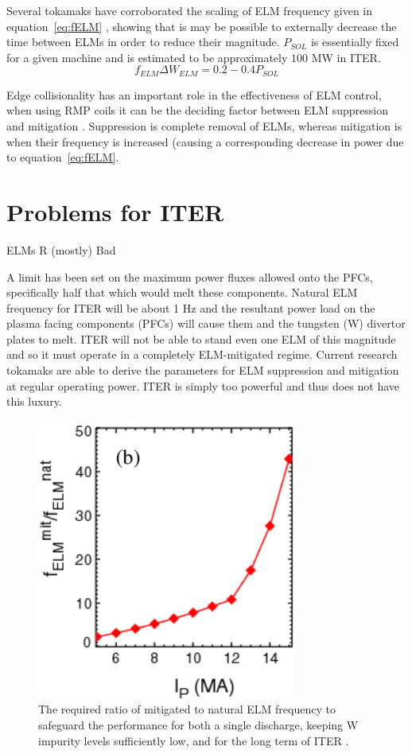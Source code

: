 \documentclass[12pt]{article}  %
\begin{document}
Several tokamaks have corroborated the scaling of ELM frequency given in equation~\ref{eq:fELM} \cite{Leonard1999}\cite{Loarte2002}, showing that is may be possible to externally decrease the time between ELMs in order to reduce their magnitude. $P_{SOL}$ is essentially fixed for a given machine and is estimated to be approximately $100$ MW in ITER.\cite{Eich2013}
\begin{equation}\label{eq:fELM}
f_{ELM}\Delta W_{ELM} = 0.2-0.4 P_{SOL}
\end{equation}

Edge collisionality has an important role in the effectiveness of ELM control, when using RMP coils it can be the deciding factor between ELM suppression and mitigation \cite{Kirk2013}. Suppression is complete removal of ELMs, whereas mitigation is when their frequency is increased (causing a corresponding decrease in power due to equation~\ref{eq:fELM}.


\section{Problems for ITER}\label{sec:Problems}
ELMs R (mostly) Bad \cite{Connor2008}

A limit has been set on the maximum power fluxes allowed onto the PFCs, specifically half that which would melt these components.\cite{Loarte2014a} Natural ELM frequency for ITER will be about 1 Hz and the resultant power load on the plasma facing components (PFCs) will cause them and the tungsten (W) divertor plates to melt\cite{Federici2003}. ITER will not be able to stand even one ELM of this magnitude and so it must operate in a completely ELM-mitigated regime\cite{KirkFF}. Current research tokamaks are able to derive the parameters for ELM suppression and mitigation at regular operating power. ITER is simply too powerful and thus does not have this luxury.

\begin{figure}
\includegraphics[scale=0.6]{Figures/FreqEnhance.png}
\centering
\caption{The required ratio of mitigated to natural ELM frequency to safeguard the performance for both a single discharge, keeping W impurity levels sufficiently low, and for the long term of ITER \cite{Kirk2013}.}\label{fig:FreqEnhance}
\end{figure}
\end{document}
